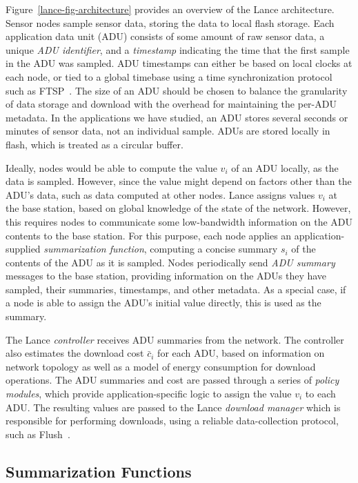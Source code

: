 Figure~\ref{lance-fig-architecture} provides an overview of the Lance
architecture. Sensor nodes sample sensor data, storing the data to local
flash storage. Each application data unit (ADU) consists of some amount of
raw sensor data, a unique \textit{ADU identifier}, and a \textit{timestamp}
indicating the time that the first sample in the ADU was sampled. ADU
timestamps can either be based on local clocks at each node, or tied to a
global timebase using a time synchronization protocol such as
FTSP~\cite{ftsp}. The size of an ADU should be chosen to balance the
granularity of data storage and download with the overhead for maintaining
the per-ADU metadata. In the applications we have studied, an ADU stores
several seconds or minutes of sensor data, not an individual sample. ADUs are
stored locally in flash, which is treated as a circular buffer.

Ideally, nodes would be able to compute the value $v_i$ of an ADU locally, as
the data is sampled. However, since the value might depend on factors other
than the ADU's data, such as data computed at other nodes. Lance assigns
values $v_i$ at the base station, based on global knowledge of the state of
the network. However, this requires nodes to communicate some low-bandwidth
information on the ADU contents to the base station. For this purpose, each
node applies an application-supplied \textit{summarization function},
computing a concise summary $s_i$ of the contents of the ADU as it is
sampled. Nodes periodically send \textit{ADU summary} messages to the base
station, providing information on the ADUs they have sampled, their
summaries, timestamps, and other metadata. As a special case, if a node is
able to assign the ADU's initial value directly, this is used as the summary.

The Lance \textit{controller} receives ADU summaries from the network. The
controller also estimates the download cost $\bar{c}_i$ for each ADU, based
on information on network topology as well as a model of energy consumption
for download operations. The ADU summaries and cost are passed through a
series of \textit{policy modules}, which provide application-specific logic
to assign the value $v_i$ to each ADU. The resulting values are passed to
the Lance \textit{download manager} which is responsible for performing
downloads, using a reliable data-collection protocol, such as
Flush~\cite{flush-sensys07}.

\subsection{Summarization Functions}

